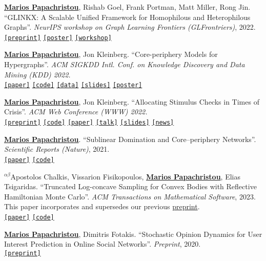 \documentclass[margin]{res}
\newcommand{\alphabeticalorder}[0]{\ensuremath {^{\alpha \beta}}}
\newcommand{\specialurl}[2]{\href {#2} {\texttt{[#1]}}}
\newcommand{\preprint}[1]{\specialurl {preprint} {#1}}
\newcommand{\code}[1]{\specialurl {code} {#1}}
\newcommand{\data}[1]{\specialurl {data} {#1}}
\newcommand{\talk}[1]{\specialurl {talk} {#1}}
\newcommand{\slides}[1]{\specialurl {slides} {#1}}
\newcommand{\poster}[1]{\specialurl {poster} {#1}}
\newcommand{\paper}[1]{\specialurl {paper} {#1}}
\newcommand{\workshop}[1]{\specialurl {workshop} {#1}}
\newcommand{\authorref}[1]{\underline {\textbf{#1}}}
\newcommand{\news}[1]{\specialurl {news} {#1}}
\newcommand{\authorme}{\authorref{Marios Papachristou}}
\begin{document}
\begin{resume}
\begin{compactenum}
   \item \authorme, Rishab Goel, Frank Portman, Matt Miller, Rong Jin. ``GLINKX: A Scalable Unified Framework for Homophilous and Heterophilous Graphs''. \emph{NeurIPS workshop on Graph Learning Frontiers (GLFrontriers)}, 2022. \\ \preprint{https://arxiv.org/abs/2211.00550} \poster{https://drive.google.com/file/d/14LwkvoH7sUe6qGvINGqTuMSHid16J3Av/view?usp=share_link} \workshop{https://openreview.net/forum?id=GlViaJSwnlK}

   \item \authorme, Jon Kleinberg. ``Core-periphery Models for Hypergraphs''. \emph{ACM SIGKDD Intl. Conf. on Knowledge Discovery and Data Mining (KDD) 2022.} \\
   \paper{https://arxiv.org/abs/2206.00783} \code{https://doi.org/10.5281/zenodo.5965849} \data{https://doi.org/10.5281/zenodo.5943043} \slides{https://drive.google.com/file/d/1k9pjPaeDtg7jhUivjlEmyunimcUb-DxL/view?usp=sharing} \poster{https://drive.google.com/file/d/1RJ3C7KKhTemfj5OBAiEXUHMVp-TJhTDs/view?usp=sharing}
   \item  \authorme, Jon Kleinberg. ``Allocating Stimulus Checks in Times of Crisis''. \emph{ACM Web Conference (WWW) 2022.} \\\preprint{https://arxiv.org/abs/2106.07560} \code{https://github.com/papachristoumarios/financial-contagion} \paper{https://doi.org/10.1145/3485447.3512047} \talk{https://youtu.be/WUmPBztK8Mo} \slides{https://drive.google.com/file/d/1v4v4jPOTzFtP8a5dhAFLoIjZSRDxAjBz/view?usp=sharing} \news{https://www.minneapolisfed.org/article/2022/social-policy-in-the-age-of-algorithms-an-interview-with-jon-kleinberg}   
   \item \authorme. ``Sublinear Domination and Core--periphery Networks''. \emph{Scientific Reports (Nature)}, 2021. \\ \paper{http://www.nature.com/articles/s41598-021-94105-8} \code{https://bit.ly/3wKNGI0} 
    \item \alphabeticalorder Apostolos Chalkis, Vissarion Fisikopoulos, \authorme, Elias Tsigaridas. ``Truncated Log-concave Sampling for Convex Bodies with Reflective Hamiltonian Monte Carlo''.   \emph{ACM Transactions on Mathematical Software}, 2023. This paper incorporates and supersedes our previous \href{https://arxiv.org/abs/2102.13068}{preprint}. \\ \paper{https://doi.org/10.1145/3589505} \code{https://github.com/GeomScale/volume_approximation}
    \item \authorme, Dimitris Fotakis. ``Stochastic Opinion Dynamics for User Interest Prediction in Online Social Networks''.  \emph{Preprint}, 2020. \\ \preprint{https://www.researchgate.net/publication/353006940_Stochastic_Opinion_Dynamics_for_Interest_Prediction_in_Social_Networks}

\end{compactenum}
\end{resume}
\end{document}
